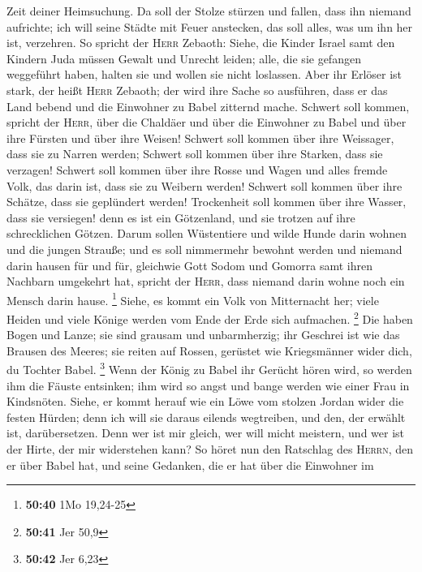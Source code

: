 Zeit deiner Heimsuchung.  Da soll der Stolze stürzen und
fallen, dass ihn niemand aufrichte; ich will seine Städte mit Feuer
anstecken, das soll alles, was um ihn her ist, verzehren.
 So spricht der \textsc{Herr} Zebaoth: Siehe, die Kinder
Israel samt den Kindern Juda müssen Gewalt und Unrecht leiden; alle, die
sie gefangen weggeführt haben, halten sie und wollen sie nicht
loslassen.  Aber ihr Erlöser ist stark, der heißt
\textsc{Herr} Zebaoth; der wird ihre Sache so ausführen, dass er das
Land bebend und die Einwohner zu Babel zitternd mache. 
Schwert soll kommen, spricht der \textsc{Herr}, über die Chaldäer und
über die Einwohner zu Babel und über ihre Fürsten und über ihre Weisen!
 Schwert soll kommen über ihre Weissager, dass sie zu
Narren werden; Schwert soll kommen über ihre Starken, dass sie verzagen!
 Schwert soll kommen über ihre Rosse und Wagen und alles
fremde Volk, das darin ist, dass sie zu Weibern werden! Schwert soll
kommen über ihre Schätze, dass sie geplündert werden! 
Trockenheit soll kommen über ihre Wasser, dass sie versiegen! denn es
ist ein Götzenland, und sie trotzen auf ihre schrecklichen Götzen.
 Darum sollen Wüstentiere und wilde Hunde darin wohnen
und die jungen Strauße; und es soll nimmermehr bewohnt werden und
niemand darin hausen für und für,  gleichwie Gott Sodom
und Gomorra samt ihren Nachbarn umgekehrt hat, spricht der
\textsc{Herr}, dass niemand darin wohne noch ein Mensch darin hause.
\footnote{\textbf{50:40} 1Mo 19,24-25}  Siehe, es kommt
ein Volk von Mitternacht her; viele Heiden und viele Könige werden vom
Ende der Erde sich aufmachen. \footnote{\textbf{50:41} Jer 50,9}
 Die haben Bogen und Lanze; sie sind grausam und
unbarmherzig; ihr Geschrei ist wie das Brausen des Meeres; sie reiten
auf Rossen, gerüstet wie Kriegsmänner wider dich, du Tochter Babel.
\footnote{\textbf{50:42} Jer 6,23}  Wenn der König zu
Babel ihr Gerücht hören wird, so werden ihm die Fäuste entsinken; ihm
wird so angst und bange werden wie einer Frau in Kindsnöten.
 Siehe, er kommt herauf wie ein Löwe vom stolzen Jordan
wider die festen Hürden; denn ich will sie daraus eilends wegtreiben,
und den, der erwählt ist, darübersetzen. Denn wer ist mir gleich, wer
will micht meistern, und wer ist der Hirte, der mir widerstehen kann?
 So höret nun den Ratschlag des \textsc{Herrn}, den er
über Babel hat, und seine Gedanken, die er hat über die Einwohner im
